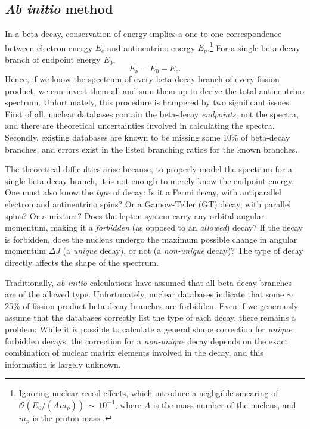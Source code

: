 \documentclass[../thesis.tex]{subfiles}
\begin{document}
\subsection{\textit{Ab initio} method}
\label{sec:abinitio}

In a beta decay, conservation of energy implies a one-to-one correspondence between electron energy $E_e$ and antineutrino energy $E_\nu$.\footnote{Ignoring nuclear recoil effects, which introduce a negligible smearing of $\mathcal{O}(E_0/(Am_p))\,\sim\,10^{-4}$, where $A$ is the mass number of the nucleus, and $m_p$ is the proton mass \cite{PhysRevC.84.024617}.} For a single beta-decay branch of endpoint energy $E_0$,
\begin{equation}
  \label{eq:reacEnuEe}
  E_\nu = E_0 - E_e.
\end{equation}
Hence, if we know the spectrum of every beta-decay branch of every fission product, we can invert them all and sum them up to derive the total antineutrino spectrum. Unfortunately, this procedure is hampered by two significant issues. First of all, nuclear databases contain the beta-decay \emph{endpoints}, not the spectra, and there are theoretical uncertainties involved in calculating the spectra. Secondly, existing databases \cite{ENSDF,jendl} are known to be missing some 10\% of beta-decay branches, and errors exist in the listed branching ratios for the known branches.

The theoretical difficulties arise because, to properly model the spectrum for a single beta-decay branch, it is not enough to merely know the endpoint energy. One must also know the \emph{type} of decay: Is it a Fermi decay, with antiparallel electron and antineutrino spins? Or a Gamow-Teller (GT) decay, with parallel spins? Or a mixture? Does the lepton system carry any orbital angular momentum, making it a \emph{forbidden} (as opposed to an \emph{allowed}) decay? If the decay is forbidden, does the nucleus undergo the maximum possible change in angular momentum $\Delta J$ (a \emph{unique} decay), or not (a \emph{non-unique} decay)? The type of decay directly affects the shape of the spectrum.

Traditionally, \emph{ab initio} calculations have assumed that all beta-decay branches are of the allowed type. Unfortunately, nuclear databases indicate that some $\sim$25\% of fission product beta-decay branches are forbidden. Even if we generously assume that the databases correctly list the type of each decay, there remains a problem: While it is possible to calculate a general shape correction for \emph{unique} forbidden decays, the correction for a \emph{non-unique} decay depends on the exact combination of nuclear matrix elements involved in the decay, and this information is largely unknown.
\end{document}
